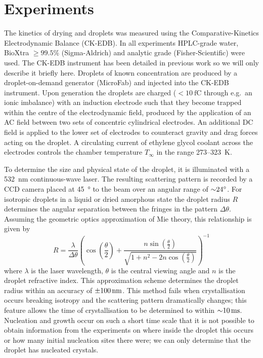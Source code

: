 \documentclass[11pt,twoside]{report}
\begin{document}
\section{Experiments}
\label{sec:experiments}

The kinetics of drying  and  droplets was measured using the Comparative-Kinetics Electrodynamic Balance (CK-EDB).
In all experiments HPLC-grade water, BioXtra $\ge 99.5\%$  (Sigma-Aldrich) and analytic grade  (Fisher-Scientific) were used.
The CK-EDB instrument has been detailed in previous work \cite{DaviesAST2012} so we will only describe it briefly here.
Droplets of known concentration are produced by a droplet-on-demand generator (MicroFab) and injected into the CK-EDB instrument.
Upon generation the droplets are charged ($<\SI{10}{\femto\coulomb}$ through e.g.\ an ionic imbalance) with an induction electrode such that they become trapped within the centre of the electrodynamic field, produced by the application of an AC field between two sets of concentric cylindrical electrodes.
An additional DC field is applied to the lower set of electrodes to counteract gravity and drag forces acting on the droplet.
A circulating current of ethylene glycol coolant across the electrodes controls the chamber temperature $T_{\infty}$ in the range 273--\SI{323}{\kelvin}.

To determine the size and physical state of the droplet, it is illuminated with a \SI{532}{\nano\metre} continuous-wave laser.
The resulting scattering pattern is recorded by a CCD camera placed at \SI{45}{\degree} to the beam over an angular range of $\SI{\sim24}{\degree}$.
For isotropic droplets in a liquid or dried amorphous state the droplet radius $R$ determines the angular separation between the fringes in the pattern $\Delta \theta$.
Assuming the geometric optics approximation of Mie theory, this relationship is given by
\begin{equation*}
  R
  =
  \frac{\lambda}{\Delta \theta} \left(
  \cos{\left(\frac{\theta}{2}\right)}
  + \frac{n \sin{\left(\frac{\theta}{2}\right)}}{\sqrt{1 + n^2 - 2n \cos{\left(\frac{\theta}{2}\right)}}}
  \right)^{-1}
\end{equation*}
where $\lambda$ is the laser wavelength, $\theta$ is the central viewing angle and $n$ is the droplet refractive index.
This approximation scheme determines the droplet radius within an accuracy of $\SI{\pm100}{\nano\metre}$.
This method fails when crystallisation occurs breaking isotropy and the scattering pattern dramatically changes; this feature allows the time of crystallisation to be determined to within $\SI{\sim10}{\milli\second}$.
Nucleation and growth occur on such a short time scale that it is not possible to obtain information from the experiments on where inside the droplet this occurs or how many initial nucleation sites there were; we can only determine that the droplet has nucleated crystals.
\end{document}
